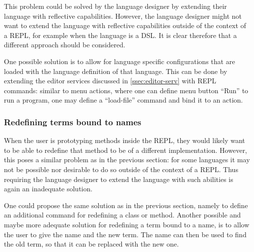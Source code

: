 This problem could be solved by the language designer by extending
their language with reflective capabilities. However, the language
designer might not want to extend the language with reflective
capabilities outside of the context of a REPL, for example when the
language is a DSL. It is clear therefore that a different approach
should be considered.

One possible solution is to allow for language specific configurations
that are loaded with the language definition of that language. This
can be done by extending the editor services discussed in
\cref{ssec:editor-serv} with REPL commands: similar to menu actions,
where one can define menu button ``Run'' to run a program, one may
define a ``load-file'' command and bind it to an action.

\subsubsection{Redefining terms bound to names}
\label{sec:redef-cont-bound}
When the user is prototyping methods inside the REPL, they would
likely want to be able to redefine that method to be of a different
implementation. However, this poses a similar problem as in the
previous section: for some languages it may not be possible nor
desirable to do so outside of the context of a REPL. Thus requiring
the language designer to extend the language with such abilities is
again an inadequate solution.

One could propose the same solution as in the previous section, namely to
define an additional command for redefining a class or method. Another possible
and maybe more adequate solution for redefining a term bound to a name, is to
allow the user to give the name and the new term. The name can then be used to
find the old term, so that it can be replaced with the new one.

